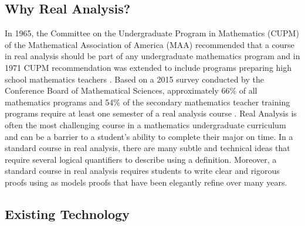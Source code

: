 \documentclass[11pt]{article}
\begin{document}
\subsection{Why Real Analysis?}
In 1965, the Committee on the Undergraduate Program in Mathematics (CUPM) of the Mathematical Association of America (MAA) recommended that a course in real analysis should be part of any undergraduate mathematics program and in 1971 CUPM recommendation was extended to include programs preparing high school mathematics teachers \cite{maa:71}.  Based on a 2015 survey conducted by the Conference Board of Mathematical Sciences, approximately 66\% of all mathematics programs and 54\% of the secondary mathematics teacher training programs require at least one semester of a real analysis course \cite{cbms:15}. Real Analysis is often the most challenging course in a mathematics undergraduate curriculum and can be a barrier to a student's ability to complete their major on time.  In a standard course in real analysis, there are many subtle and technical ideas that require several logical quantifiers to describe using a definition.  Moreover, a standard course in real analysis requires students to write clear and rigorous proofs using as models proofs that have been elegantly refine over many years.

\subsection{Existing Technology}
\end{document}
